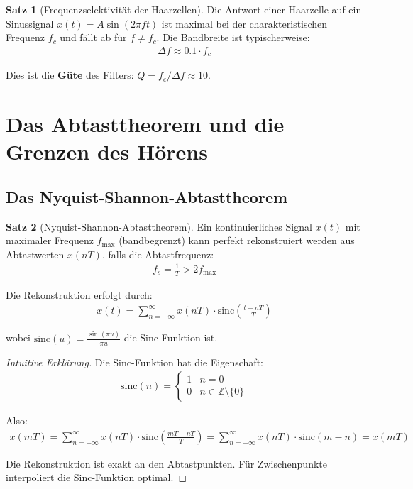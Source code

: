 ﻿\documentclass[a4paper,12pt]{report}
\theoremstyle{definition}
\newtheorem{satz}{Satz}
\begin{document}
	\begin{satz}[Frequenzselektivität der Haarzellen]
		Die Antwort einer Haarzelle auf ein Sinussignal $x(t) = A \sin(2\pi f t)$ ist maximal bei der charakteristischen Frequenz $f_c$ und fällt ab für $f \neq f_c$. Die Bandbreite ist typischerweise:
		\begin{align}
			\Delta f \approx 0.1 \cdot f_c
		\end{align}
		
		Dies ist die \textbf{Güte} des Filters: $Q = f_c / \Delta f \approx 10$.
	\end{satz}
	
	\section{Das Abtasttheorem und die Grenzen des Hörens}
	
	\subsection{Das Nyquist-Shannon-Abtasttheorem}
	
	\begin{satz}[Nyquist-Shannon-Abtasttheorem]
		Ein kontinuierliches Signal $x(t)$ mit maximaler Frequenz $f_{\max}$ (bandbegrenzt) kann perfekt rekonstruiert werden aus Abtastwerten $x(nT)$, falls die Abtastfrequenz:
		\begin{align}
			f_s = \frac{1}{T} > 2 f_{\max}
		\end{align}
		
		Die Rekonstruktion erfolgt durch:
		\begin{align}
			x(t) = \sum_{n=-\infty}^{\infty} x(nT) \cdot \text{sinc}\left(\frac{t - nT}{T}\right)
		\end{align}
		
		wobei $\text{sinc}(u) = \frac{\sin(\pi u)}{\pi u}$ die Sinc-Funktion ist.
	\end{satz}
	
	\begin{proof}[Intuitive Erklärung]
		Die Sinc-Funktion hat die Eigenschaft:
		\begin{align}
			\text{sinc}(n) = \begin{cases} 1 & n = 0 \\ 0 & n \in \mathbb{Z} \setminus \{0\} \end{cases}
		\end{align}
		
		Also:
		\begin{align}
			x(mT) = \sum_{n=-\infty}^{\infty} x(nT) \cdot \text{sinc}\left(\frac{mT - nT}{T}\right) = \sum_{n=-\infty}^{\infty} x(nT) \cdot \text{sinc}(m - n) = x(mT)
		\end{align}
		
		Die Rekonstruktion ist exakt an den Abtastpunkten. Für Zwischenpunkte interpoliert die Sinc-Funktion optimal.
	\end{proof}
	
\end{document}
